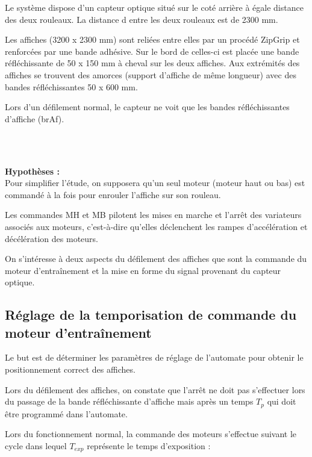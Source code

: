 Le système dispose d'un capteur optique situé sur le coté arrière à égale distance des deux rouleaux. La distance 
\og d \fg entre les deux rouleaux est de 2300 mm.

Les affiches (3200 x 2300 mm) sont reliées entre elles par un procédé ZipGrip et renforcées par une bande adhésive. Sur le bord de celles-ci est placée une bande réfléchissante de 50 x 150 mm à cheval sur les deux affiches. Aux extrémités des affiches se trouvent des amorces (support d'affiche de même longueur) avec des bandes réfléchissantes 50 x 600 mm.

Lors d'un défilement normal, le capteur ne voit que les bandes réfléchissantes d'affiche (brAf).

~\ \\ ~\

\textbf{Hypothèses :}\\

Pour simplifier l'étude, on supposera qu'un seul moteur (moteur haut ou bas) est commandé à la fois pour enrouler l'affiche sur son rouleau.

Les commandes MH et MB pilotent les mises en marche et l'arrêt des variateurs associés aux moteurs, c'est-à-dire qu'elles déclenchent les rampes d'accélération et décélération des moteurs.

On s'intéresse à deux aspects du défilement des affiches que sont la commande du moteur d'entraînement et la mise en forme du signal provenant du capteur optique.

\subsection{Réglage de la temporisation de commande du moteur d'entraînement}

Le but est de déterminer les paramètres de réglage de l'automate pour obtenir le positionnement correct des affiches.

Lors du défilement des affiches, on constate que l'arrêt ne doit pas s'effectuer lors du passage de la bande réfléchissante d'affiche mais après un temps $T_p$ qui doit être programmé dans l'automate.

Lors du fonctionnement normal, la commande des moteurs s'effectue suivant le cycle dans lequel $T_{exp}$ représente le temps d'exposition :
 
